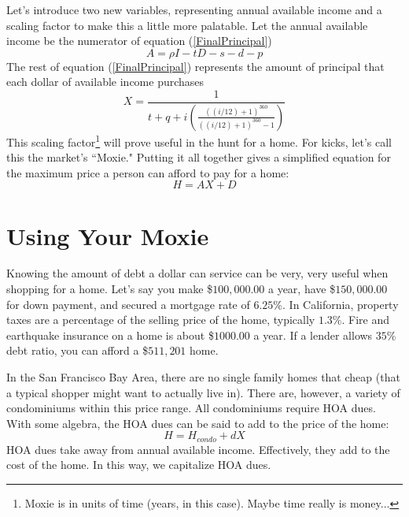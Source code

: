 \documentclass{article}
\begin{document}
Let's introduce two new variables, representing annual available income and a scaling factor to make this a little more palatable. Let the annual available income be the numerator of equation (\ref{FinalPrincipal})
\begin{equation}
\label{AvailableIncome}
A = \rho I - tD - s - d - p
\end{equation}
The rest of equation (\ref{FinalPrincipal}) represents the amount of principal that each dollar of available income purchases 
\begin{equation}
\label{Kappa}
X = \frac{1}{t + q +
i \left( \frac{((i/12) + 1)^{360}}{((i/12) + 1)^{360} - 1} \right)}
\end{equation}
This scaling factor\footnote{ 
Moxie is in units of time (years, in this case). Maybe time really is money...}
will prove useful in the hunt for a home. For kicks, let's call this the market's ``Moxie." Putting it all together gives a simplified equation for the maximum price a person can afford to pay for a home:
\begin{equation}
\label{SimplifiedHomePrice}
H = AX + D
\end{equation}

\pagebreak


\section{Using Your Moxie}

Knowing the amount of debt a dollar can service can be very, very useful when 
shopping for a home.  Let's say you make \$$100,000.00$ a year, have \$$150,000.00$ for down payment, and secured a mortgage rate of $6.25$\%.  In California, property taxes are a percentage of the selling price of the home, typically $1.3$\%.  Fire and earthquake insurance on a home is about \$$1000.00$ a year. If a lender allows $35$\% debt ratio, you can afford a \$$511,201$ home.

In the San Francisco Bay Area, there are no single family homes that cheap (that a typical shopper might want to actually live in).  There are, however, a variety of condominiums within this price range.  All condominiums require HOA dues.  With some algebra, the HOA dues can be said to add to the price of the home:
\begin{equation}
H = H_{condo} + dX
\end{equation}
HOA dues take away from annual available income.  Effectively, they add to the cost of the home.  In this way, we capitalize HOA dues.
\end{document}
